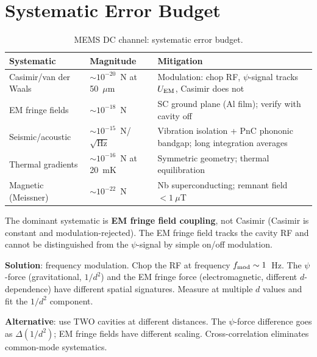 \documentclass[11pt]{article}
\theoremstyle{definition}
\theoremstyle{remark}
\begin{document}
\section{Systematic Error Budget}

\begin{table}[H]
\centering
\caption{MEMS DC channel: systematic error budget.}
\renewcommand{\arraystretch}{1.3}
\begin{tabular}{@{}p{4cm}p{3cm}p{5cm}@{}}
\toprule
\textbf{Systematic} & \textbf{Magnitude} & \textbf{Mitigation} \\
\midrule
\rowcolor{rowhi}
Casimir/van der Waals & $\sim 10^{-20}$~N at 50~$\mu$m &
  Modulation: chop RF, $\psi$-signal tracks $U_{\rm EM}$,
  Casimir does not \\
\rowcolor{rowhi}
EM fringe fields & $\sim 10^{-18}$~N &
  SC ground plane (Al film); verify with cavity off \\
\rowcolor{rowmed}
Seismic/acoustic & $\sim 10^{-15}$~N/$\sqrt{\text{Hz}}$ &
  Vibration isolation + PnC phononic bandgap;
  long integration averages \\
\rowcolor{rowmed}
Thermal gradients & $\sim 10^{-16}$~N at 20~mK &
  Symmetric geometry; thermal equilibration \\
\rowcolor{rowok}
Magnetic (Meissner) & $\sim 10^{-22}$~N &
  Nb superconducting; remnant field $< 1~\mu$T \\
\bottomrule
\end{tabular}
\end{table}

The dominant systematic is \textbf{EM fringe field coupling}, not
Casimir (Casimir is constant and modulation-rejected). The EM fringe
field tracks the cavity RF and cannot be distinguished from the
$\psi$-signal by simple on/off modulation.

\textbf{Solution}: frequency modulation. Chop the RF at frequency
$f_{\rm mod} \sim 1$~Hz. The $\psi$-force (gravitational, $1/d^2$)
and the EM fringe force (electromagnetic, different $d$-dependence)
have different spatial signatures. Measure at multiple $d$ values
and fit the $1/d^2$ component.

\textbf{Alternative}: use TWO cavities at different distances.
The $\psi$-force difference goes as $\Delta(1/d^2)$; EM fringe
fields have different scaling. Cross-correlation eliminates
common-mode systematics.


\end{document}
